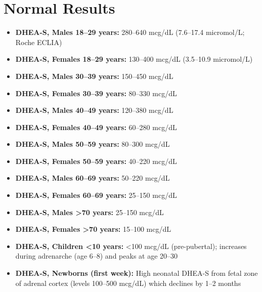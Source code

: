 \section*{Normal Results}
\begin{itemize}
  \item \textbf{DHEA-S, Males 18--29 years:} 280--640 mcg/dL (7.6--17.4 micromol/L; Roche ECLIA)
  \item \textbf{DHEA-S, Females 18--29 years:} 130--400 mcg/dL (3.5--10.9 micromol/L)
  \item \textbf{DHEA-S, Males 30--39 years:} 150--450 mcg/dL
  \item \textbf{DHEA-S, Females 30--39 years:} 80--330 mcg/dL
  \item \textbf{DHEA-S, Males 40--49 years:} 120--380 mcg/dL
  \item \textbf{DHEA-S, Females 40--49 years:} 60--280 mcg/dL
  \item \textbf{DHEA-S, Males 50--59 years:} 80--300 mcg/dL
  \item \textbf{DHEA-S, Females 50--59 years:} 40--220 mcg/dL
  \item \textbf{DHEA-S, Males 60--69 years:} 50--220 mcg/dL
  \item \textbf{DHEA-S, Females 60--69 years:} 25--150 mcg/dL
  \item \textbf{DHEA-S, Males >70 years:} 25--150 mcg/dL
  \item \textbf{DHEA-S, Females >70 years:} 15--100 mcg/dL
  \item \textbf{DHEA-S, Children <10 years:} <100 mcg/dL (pre-pubertal); increases during adrenarche (age 6--8) and peaks at age 20--30
  \item \textbf{DHEA-S, Newborns (first week):} High neonatal DHEA-S from fetal zone of adrenal cortex (levels 100--500 mcg/dL) which declines by 1--2 months
\end{itemize}

